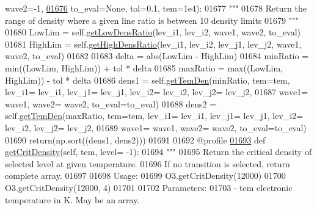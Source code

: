 \begin{DoxyCode}
{{      wave2=-1, 
\hypertarget{pynebcore_8py_source_l01676}{}\hyperlink{classpyneb_1_1core_1_1pynebcore_1_1_atom_a30ea60641df87c5eaf8af392d31da920}{01676}                         to\_eval=\textcolor{keywordtype}{None}, tol=0.1, tem=1e4):
01677         \textcolor{stringliteral}{"""}
01678 \textcolor{stringliteral}{        Return the range of density where a given line ratio is between 10%
       density limits}
01679 \textcolor{stringliteral}{        """}
01680         LowLim = self.\hyperlink{classpyneb_1_1core_1_1pynebcore_1_1_atom_aa6db2a3425e5a35f0bd04f05bcb25ee1}{getLowDensRatio}(lev\_i1, lev\_i2, wave1, wave2, to\_eval)
01681         HighLim = self.\hyperlink{classpyneb_1_1core_1_1pynebcore_1_1_atom_ac2e1509a2acc642c00696f3787e95f95}{getHighDensRatio}(lev\_i1, lev\_i2, lev\_j1, lev\_j2, wave1, wave2, 
      to\_eval)
01682         
01683         delta = abs(LowLim - HighLim)
01684         minRatio = min((LowLim, HighLim)) + tol * delta
01685         maxRatio = max((LowLim, HighLim)) - tol * delta
01686         dens1 = self.\hyperlink{classpyneb_1_1core_1_1pynebcore_1_1_atom_a5e1aa59c92bf62bae8bd756a4405eb25}{getTemDen}(minRatio, tem=tem, lev\_i1= lev\_i1, lev\_j1= lev\_j1, lev\_i2= lev\_i2, 
      lev\_j2= lev\_j2,
01687                   wave1= wave1, wave2= wave2, to\_eval=to\_eval)
01688         dens2 = self.\hyperlink{classpyneb_1_1core_1_1pynebcore_1_1_atom_a5e1aa59c92bf62bae8bd756a4405eb25}{getTemDen}(maxRatio, tem=tem, lev\_i1= lev\_i1, lev\_j1= lev\_j1, lev\_i2= lev\_i2, 
      lev\_j2= lev\_j2,
01689                   wave1= wave1, wave2= wave2, to\_eval=to\_eval)
01690         return(np.sort((dens1, dens2)))
01691                
01692     @profile
\hypertarget{pynebcore_8py_source_l01693}{}\hyperlink{classpyneb_1_1core_1_1pynebcore_1_1_atom_aae95b1cb36defadad24cf94459203eb3}{01693}     \textcolor{keyword}{def }\hyperlink{classpyneb_1_1core_1_1pynebcore_1_1_atom_aae95b1cb36defadad24cf94459203eb3}{getCritDensity}(self, tem, level= -1):
01694         \textcolor{stringliteral}{"""}
01695 \textcolor{stringliteral}{        Return the critical density of selected level at given temperature. }
01696 \textcolor{stringliteral}{        If no transition is selected, return complete array.}
01697 \textcolor{stringliteral}{        }
01698 \textcolor{stringliteral}{        Usage:}
01699 \textcolor{stringliteral}{            O3.getCritDensity(12000)}
01700 \textcolor{stringliteral}{            O3.getCritDensity(12000, 4)}
01701 \textcolor{stringliteral}{        }
01702 \textcolor{stringliteral}{        Parameters:}
01703 \textcolor{stringliteral}{            - tem    electronic temperature in K. May be an array.}
}}
\end{DoxyCode}

